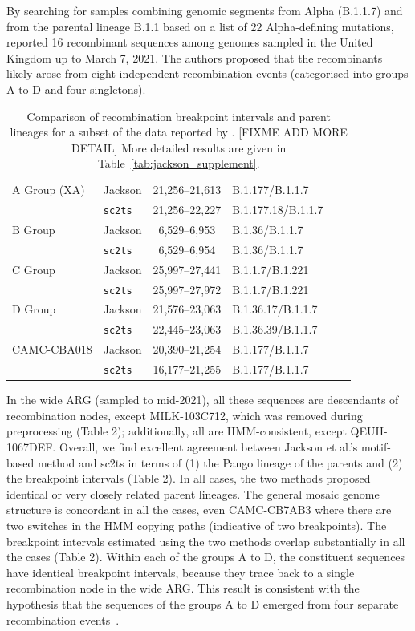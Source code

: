 \documentclass{article}
\begin{document}
By searching for samples combining genomic segments from Alpha (B.1.1.7) and from the parental lineage B.1.1 based on a list of 22 Alpha-defining mutations, \citet{Jackson2021-ik} reported 16 recombinant sequences among genomes sampled in the United Kingdom up to March 7, 2021. The authors proposed that the recombinants likely arose from eight independent recombination events (categorised into groups A to D and four singletons).


\begin{table} \centering
\begin{tabular}{ll|clll}
\toprule
A Group (XA) & Jackson        &  21,256–21,613 & B.1.177/B.1.1.7 \\
             & \texttt{sc2ts} &  21,256--22,227 & B.1.177.18/B.1.1.7 \\
\midrule
B Group & Jackson        &  6,529--6,953 & B.1.36/B.1.1.7  \\
        & \texttt{sc2ts} &  6,529--6,954 & B.1.36/B.1.1.7  \\
\midrule
C Group & Jackson        &  25,997--27,441 &  B.1.1.7/B.1.221 \\
        & \texttt{sc2ts} &  25,997--27,972 &  B.1.1.7/B.1.221 \\
\midrule
D Group & Jackson        &  21,576--23,063 &  B.1.36.17/B.1.1.7 \\
        & \texttt{sc2ts} &  22,445--23,063 &  B.1.36.39/B.1.1.7 \\
\midrule
CAMC-CBA018 & Jackson        &  20,390--21,254 & B.1.177/B.1.1.7 \\
            & \texttt{sc2ts} &  16,177--21,255 & B.1.177/B.1.1.7 \\
\midrule
\end{tabular}
\caption{\label{tab:jackson}Comparison of recombination breakpoint intervals and parent lineages for a subset of the data reported by \cite{Jackson2021-ik}. [FIXME ADD MORE DETAIL] More detailed results are given in Table~\ref{tab:jackson_supplement}.}
\end{table}

In the wide ARG (sampled to mid-2021), all these sequences are descendants of recombination nodes, except MILK-103C712, which was removed during preprocessing (Table 2); additionally, all are HMM-consistent, except QEUH-1067DEF. Overall, we find excellent agreement between Jackson et al.’s motif-based method and sc2ts in terms of (1) the Pango lineage of the parents and (2) the breakpoint intervals (Table 2). In all cases, the two methods proposed identical or very closely related parent lineages. The general mosaic genome structure is concordant in all the cases, even CAMC-CB7AB3 where there are two switches in the HMM copying paths (indicative of two breakpoints). The breakpoint intervals estimated using the two methods overlap substantially in all the cases (Table 2). Within each of the groups A to D, the constituent sequences have identical breakpoint intervals, because they trace back to a single recombination node in the wide ARG. This result is consistent with the hypothesis that the sequences of the groups A to D emerged from four separate recombination events~\cite{Jackson2021-ik}.
\end{document}
